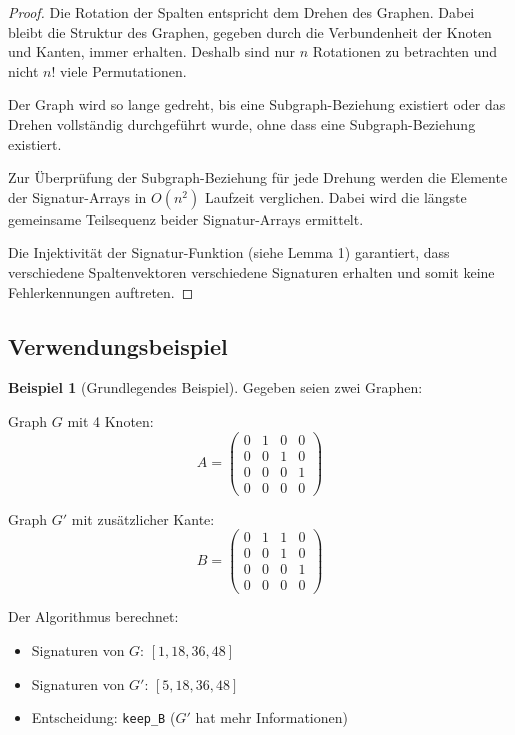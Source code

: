 ﻿\documentclass[a4paper,12pt]{article}
\theoremstyle{definition}
\newtheorem{beispiel}{Beispiel}
\begin{document}
\begin{proof}
	Die Rotation der Spalten entspricht dem Drehen des Graphen. Dabei bleibt die Struktur des Graphen, gegeben durch die Verbundenheit der Knoten und Kanten, immer erhalten. Deshalb sind nur $n$ Rotationen zu betrachten und nicht $n!$ viele Permutationen.
	
	Der Graph wird so lange gedreht, bis eine Subgraph-Beziehung existiert oder das Drehen vollständig durchgeführt wurde, ohne dass eine Subgraph-Beziehung existiert.
	
	Zur Überprüfung der Subgraph-Beziehung für jede Drehung werden die Elemente der Signatur-Arrays in $O(n^2)$ Laufzeit verglichen. Dabei wird die längste gemeinsame Teilsequenz beider Signatur-Arrays ermittelt.
	
	Die Injektivität der Signatur-Funktion (siehe Lemma 1) garantiert, dass verschiedene Spaltenvektoren verschiedene Signaturen erhalten und somit keine Fehlerkennungen auftreten.
\end{proof}

\subsection{Verwendungsbeispiel}

\begin{beispiel}[Grundlegendes Beispiel]
	Gegeben seien zwei Graphen:
	
	Graph $G$ mit 4 Knoten:
	\[
	A = \begin{pmatrix}
		0 & 1 & 0 & 0 \\
		0 & 0 & 1 & 0 \\
		0 & 0 & 0 & 1 \\
		0 & 0 & 0 & 0
	\end{pmatrix}
	\]
	
	Graph $G'$ mit zusätzlicher Kante:
	\[
	B = \begin{pmatrix}
		0 & 1 & 1 & 0 \\
		0 & 0 & 1 & 0 \\
		0 & 0 & 0 & 1 \\
		0 & 0 & 0 & 0
	\end{pmatrix}
	\]
	
	Der Algorithmus berechnet:
	\begin{itemize}
		\item Signaturen von $G$: $[1, 18, 36, 48]$
		\item Signaturen von $G'$: $[5, 18, 36, 48]$
		\item Entscheidung: \texttt{keep\_B} ($G'$ hat mehr Informationen)
	\end{itemize}
\end{beispiel}
\end{document}
